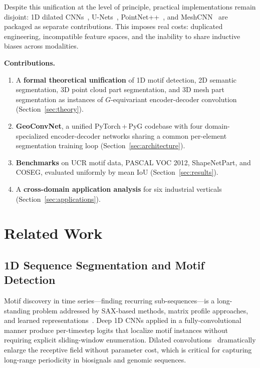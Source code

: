 \documentclass[10pt,conference]{IEEEtran}
\begin{document}
Despite this unification at the level of principle, practical
implementations remain disjoint: 1D dilated CNNs~\cite{bagnall2017great},
U-Nets~\cite{ronneberger2015unet},
PointNet++~\cite{qi2017pointnetplusplus}, and
MeshCNN~\cite{hanocka2019meshcnn} are packaged as separate contributions.
This imposes real costs: duplicated engineering, incompatible feature
spaces, and the inability to share inductive biases across modalities.

\smallskip\noindent\textbf{Contributions.}
\begin{enumerate}
  \item A \textbf{formal theoretical unification} of 1D motif detection,
    2D semantic segmentation, 3D point cloud part segmentation, and 3D
    mesh part segmentation as instances of $G$-equivariant encoder-decoder
    convolution (Section~\ref{sec:theory}).
  \item \textbf{GeoConvNet}, a unified PyTorch\,+\,PyG codebase with four
    domain-specialized encoder-decoder networks sharing a common
    per-element segmentation training loop (Section~\ref{sec:architecture}).
  \item \textbf{Benchmarks} on UCR motif data, PASCAL VOC 2012,
    ShapeNetPart, and COSEG, evaluated uniformly by mean IoU
    (Section~\ref{sec:results}).
  \item A \textbf{cross-domain application analysis} for six industrial
    verticals (Section~\ref{sec:applications}).
\end{enumerate}

\section{Related Work}
\label{sec:related}

\subsection{1D Sequence Segmentation and Motif Detection}

Motif discovery in time series---finding recurring sub-sequences---is a
long-standing problem addressed by SAX-based methods, matrix profile
approaches, and learned representations~\cite{bagnall2017great,dau2019ucr}.
Deep 1D CNNs applied in a fully-convolutional manner produce
per-timestep logits that localize motif instances without requiring explicit
sliding-window enumeration.  Dilated convolutions~\cite{chen2017deeplab}
dramatically enlarge the receptive field without parameter cost, which is
critical for capturing long-range periodicity in biosignals and genomic
sequences.
\end{document}
